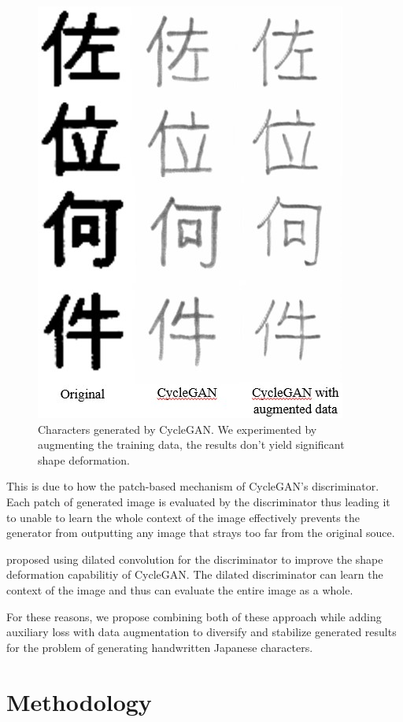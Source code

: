 \documentclass[12pt]{report}
\begin{document}
\begin{figure}[h]
	\centering
	\includegraphics[scale=1]{kanji-example}
	\caption{Characters generated by CycleGAN. We experimented by augmenting the training data, the results don't yield significant shape deformation.}
	\label{fig:kanji-example}
\end{figure}


This is due to how the patch-based mechanism of CycleGAN's discriminator. Each patch of generated image is evaluated by the discriminator thus leading it to unable to learn the whole context of the image effectively prevents the generator from outputting any image that strays too far from the original souce.

\cite{ganimorph} proposed using dilated convolution for the discriminator to improve the shape deformation capabilitiy of CycleGAN. The dilated discriminator can learn the context of the image and thus can evaluate the entire image as a whole. 

For these reasons, we propose combining both of these approach while adding auxiliary loss with data augmentation to diversify and stabilize generated results for the problem of generating handwritten Japanese characters.

\chapter{Methodology}
\label{chap:methodology}
\end{document}
